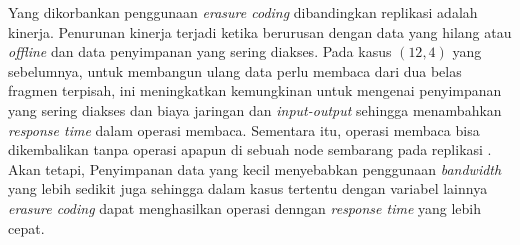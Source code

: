 Yang dikorbankan penggunaan \textit{erasure coding} dibandingkan replikasi adalah kinerja. Penurunan kinerja terjadi ketika berurusan dengan data yang hilang atau \textit{offline} dan data penyimpanan yang sering diakses. Pada kasus $(12, 4)$ yang sebelumnya, untuk membangun ulang data perlu membaca dari dua belas fragmen terpisah, ini meningkatkan kemungkinan untuk mengenai penyimpanan yang sering diakses dan biaya jaringan dan \textit{input-output} sehingga menambahkan \textit{response time} dalam operasi membaca. Sementara itu, operasi membaca bisa dikembalikan tanpa operasi apapun di sebuah node sembarang pada replikasi \parencite{huang2012erasure}. Akan tetapi, Penyimpanan data yang kecil menyebabkan penggunaan \textit{bandwidth} yang lebih sedikit juga sehingga dalam kasus tertentu dengan variabel lainnya \textit{erasure coding} dapat menghasilkan operasi denngan \textit{response time} yang lebih cepat.
